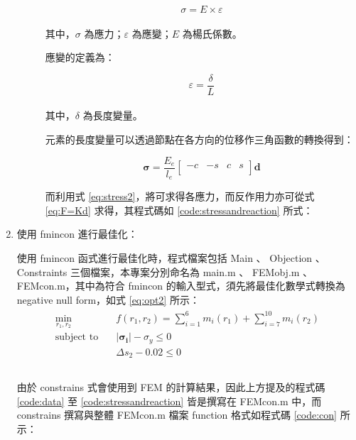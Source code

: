 \documentclass[12pt, a4paper]{article}
\begin{document}
\begin{enumerate}
\begin{description}
        \begin{equation}
            \sigma = E \times \varepsilon
            \label{eq:stress}
        \end{equation}\\
        其中，$\sigma$ 為應力；$\varepsilon$ 為應變；$E$ 為楊氏係數。
        
        應變的定義為：
        
        \begin{equation}
            \varepsilon = \frac{\delta}{L}
            \label{eq:strain}
        \end{equation}\\
        其中，$\delta$ 為長度變量。
        
        元素的長度變量可以透過節點在各方向的位移作三角函數的轉換得到：
        
        \begin{equation}
            \bm{\sigma} = \frac{E_e}{l_e} 
            \left[
            \begin{array}{cccc}
                -c &-s &c &s\\ 
            \end{array}
            \right]
            \bm{d}
            \label{eq:stress2}
        \end{equation}
        
        而利用式 \ref{eq:stress2}，將可求得各應力，而反作用力亦可從式 \ref{eq:F=Kd} 求得，其程式碼如 \ref{code:stressandreaction} 所式：
        
        
    
    \end{description}

    \item 使用 fmincon 進行最佳化：
    
    使用 fmincon 函式進行最佳化時，程式檔案包括 Main 、 Objection 、 Constraints 三個檔案，本專案分別命名為 main.m 、 FEMobj.m 、 FEMcon.m，其中為符合 fmincon 的輸入型式，須先將最佳化數學式轉換為 negative null form，如式 \ref{eq:opt2} 所示：
    \begin{align}
        \begin{split}
            \min_{r_1,r_2} \quad & f(r_1,r_2) = \sum_{i=1}^{6} m_i(r_1) + \sum_{i=7}^{10} m_i(r_2) \\
            \mbox{subject to} \quad & \left \lvert \bm{\sigma_i} \right \lvert - \sigma_y \le 0 \\
            & \Delta s_2 - 0.02 \le 0\\
        \end{split}
        \label{eq:opt2}
    \end{align}\\
    由於 constrains 式會使用到 FEM 的計算結果，因此上方提及的程式碼 \ref{code:data} 至 \ref{code:stressandreaction} 皆是撰寫在 FEMcon.m 中，而 constrains 撰寫與整體 FEMcon.m 檔案 function 格式如程式碼 \ref{code:con} 所示：
    

\end{enumerate}
\end{document}
